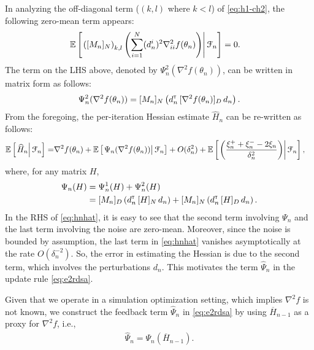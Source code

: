 In analyzing the off-diagonal term ($(k,l)$ where $k < l$) of \eqref{eq:h1-ch2}, the following zero-mean term appears:
\begin{align}
& \mathbb{E}\left[\left.\left([M_n]_{N}\right)_{k,l}   \left(\sum\limits_{i=1}^N (d_n^i)^2 \nabla^2_{ii} f(\theta_n)\right)\right| \mathcal{F}_n \right] = 0. 
\end{align}
The term on the LHS above, denoted by $\Psi_{n}^{2}(\nabla^2 f(\theta_n))$, can be written in matrix form as follows: 
\begin{align}\label{eq:ndmat}
\Psi_{n}^{2}(\nabla^2 f(\theta_n)) = [M_n]_{N}\left(d_{n}^\mathsf{\scriptscriptstyle T} \, [\nabla^2 f(\theta_n)]_{D} \, d_{n}\right).
\end{align}
From the foregoing, the per-iteration Hessian estimate $\widehat H_n$ can be re-written as follows:
\begin{align}
 \mathbb{E}\left[\left.\widehat H_n\right| \mathcal{F}_n\right] = & \nabla^2 f(\theta_n) + \mathbb{E}\left[\left.\Psi_{n}(\nabla^2 f(\theta_n))\right| \mathcal{F}_n\right]  +  O(\delta_n^2)+\mathbb{E}\left[\left.\left(\dfrac{\xi_n^+ + \xi_n^- - 2 \xi_n}{\delta_n^2} \right)\right| \mathcal{F}_n\right], \label{eq:hnhat}
\end{align}
where, for any matrix $H$, 
\begin{align}
\Psi_{n}(H) &= \Psi_{n}^{1}(H) + \Psi_{n}^{2}(H)\nonumber\\
&= [M_n]_{D}\left(d_{n}^\mathsf{\scriptscriptstyle T} \, [H]_{N} \, d_{n}\right) +  [M_n]_{N}\left(d_{n}^\mathsf{\scriptscriptstyle T} \, [H]_{D} \, d_{n}\right).\label{eq:psi}
\end{align}
In the RHS of \eqref{eq:hnhat}, it is easy to see that  the second term involving $\Psi_{n}$ and the last term involving the noise are zero-mean. Moreover, since the noise is bounded by assumption, the last term in \eqref{eq:hnhat} vanishes asymptotically at the rate $O(\delta_n^{-2})$. So, the error in estimating the Hessian is due to the second term, which involves the perturbations $d_n$. This motivates the term $\widehat \Psi_n$ in the update rule \eqref{eq:e2rdsa}. 


Given that we operate in a simulation optimization setting, which implies $\nabla^2 f$ is not known, we construct the feedback term $\widehat \Psi_n$ in \eqref{eq:e2rdsa} by using $\overline H_{n-1}$ as a proxy for $\nabla^2 f$, i.e.,
\begin{align}
\widehat \Psi_n = \Psi_{n} (\overline H_{n-1}).
\label{eq:psinhat}
\end{align}

